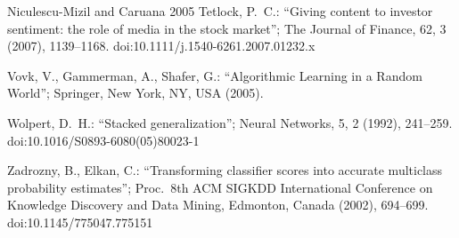 \documentclass[10pt,a4paper,oneside]{article}
\theoremstyle{definition}
\theoremstyle{plain}
\begin{document}
{\begin{thebibliography}{Niculescu-Mizil and Caruana 2005}
Tetlock, P.\ C.: ``Giving content to investor sentiment: the role of media in the stock
market''; The Journal of Finance, 62, 3 (2007), 1139--1168.
doi:10.1111/j.1540-6261.2007.01232.x

Vovk, V., Gammerman, A., Shafer, G.: ``Algorithmic Learning in a Random World'';
Springer, New York, NY, USA (2005).

Wolpert, D.\ H.: ``Stacked generalization''; Neural Networks, 5, 2 (1992), 241--259.
doi:10.1016/S0893-6080(05)80023-1

Zadrozny, B., Elkan, C.: ``Transforming classifier scores into accurate multiclass
probability estimates''; Proc.\ 8th ACM SIGKDD International Conference on Knowledge
Discovery and Data Mining, Edmonton, Canada (2002), 694--699.
doi:10.1145/775047.775151

\end{thebibliography}
\par}
\end{document}
